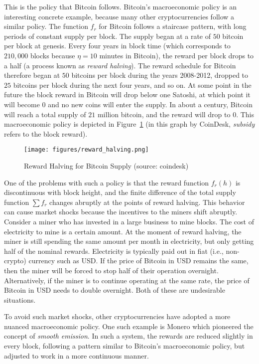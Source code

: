 This is the policy that Bitcoin follows.
Bitcoin's macroeconomic policy is an interesting concrete example, because
many other cryptocurrencies follow a similar policy. The function $f_r$
for Bitcoin follows a staircase pattern, with long periods of constant
supply per block. The supply began at a rate of $50$ bitcoin per block
at genesis. Every four years in block time (which corresponds to
$210{,}000$ blocks because $\eta = 10$ minutes in Bitcoin), the reward
per block drops to a half (a process known as \emph{reward halving}).
The reward schedule for Bitcoin therefore
began at $50$ bitcoins per block during the years 2008-2012, dropped
to $25$ bitcoins per block during the next four years, and so on. At
some point in the future the block reward in Bitcoin will drop below
one Satoshi, at which point it will become $0$ and no new coins will
enter the supply. In about a century, Bitcoin will reach a total supply
of $21$ million bitcoin, and the reward will drop to $0$. This
macroeconomic policy is depicted in Figure~\ref{fig:reward_halving}
(in this graph by CoinDesk, \emph{subsidy} refers to the block
reward).

\begin{figure}[ht]
    \centering
    \texttt{[image: figures/reward\_halving.png]}
    \caption{Reward Halving for Bitcoin Supply (source: coindesk)}
    \label{fig:reward_halving}
\end{figure}

One of the problems with such a policy is that the reward function
$f_r(h)$ is discontinuous with block height, and the finite difference
of the total supply function $\sum f_r$ changes abruptly at the points of
reward halving. This behavior can cause market shocks because the incentives
to the miners shift abruptly. Consider a miner who has invested in a large
business to mine blocks. The cost of electricity to mine is a certain
amount. At the moment of reward halving, the miner is still spending
the same amount per month in electricity, but only getting half of the
nominal rewards. Electricity is typically paid out in fiat (i.e., non-crypto)
currency such as USD. If the price of Bitcoin in USD remains the same, then
the miner will be forced to stop half of their operation overnight.
Alternatively, if the miner is to continue operating at the same rate,
the price of Bitcoin in USD needs to double overnight. Both of these
are undesirable situations.

To avoid such market shocks, other cryptocurrencies have adopted a more
nuanced macroeconomic policy. One such example is Monero which pioneered
the concept of \emph{smooth emission}. In such a system, the rewards
are reduced slightly in every block, following a pattern similar to
Bitcoin's macroeconomic policy, but adjusted to work in a more continuous
manner.

